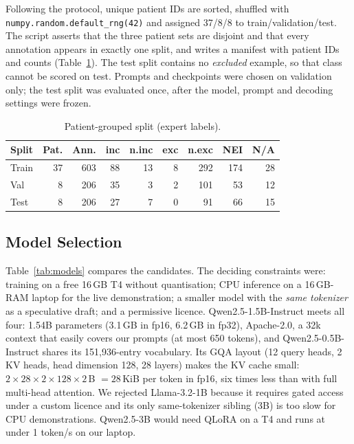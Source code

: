 \documentclass[conference]{IEEEtran}
\newcommand{\code}[1]{\texttt{\small #1}}
\begin{document}
Following the protocol, unique patient IDs are sorted, shuffled with \code{numpy.random.default\_rng(42)} and assigned 37/8/8 to train/validation/test. The script asserts that the three patient sets are disjoint and that every annotation appears in exactly one split, and writes a manifest with patient IDs and counts (Table~\ref{tab:split}). The test split contains no \emph{excluded} example, so that class cannot be scored on test. Prompts and checkpoints were chosen on validation only; the test split was evaluated once, after the model, prompt and decoding settings were frozen.

\begin{table}[t]
\caption{Patient-grouped split (expert labels).}
\label{tab:split}
\centering\footnotesize
\begin{tabular}{@{}lrrrrrrrr@{}}
\toprule
Split & Pat. & Ann. & inc & n.inc & exc & n.exc & NEI & N/A\\
\midrule
Train & 37 & 603 & 88 & 13 & 8 & 292 & 174 & 28\\
Val & 8 & 206 & 35 & 3 & 2 & 101 & 53 & 12\\
Test & 8 & 206 & 27 & 7 & 0 & 91 & 66 & 15\\
\bottomrule
\end{tabular}
\end{table}

\subsection{Model Selection}
Table~\ref{tab:models} compares the candidates. The deciding constraints were: training on a free 16\,GB T4 without quantisation; CPU inference on a 16\,GB-RAM laptop for the live demonstration; a smaller model with the \emph{same tokenizer} as a speculative draft; and a permissive licence. Qwen2.5-1.5B-Instruct meets all four: 1.54B parameters (3.1\,GB in fp16, 6.2\,GB in fp32), Apache-2.0, a 32k context that easily covers our prompts (at most 650 tokens), and Qwen2.5-0.5B-Instruct shares its 151,936-entry vocabulary. Its GQA layout (12 query heads, 2 KV heads, head dimension 128, 28 layers) makes the KV cache small: $2\times 28\times 2\times 128\times 2$\,B $=28$\,KiB per token in fp16, six times less than with full multi-head attention. We rejected Llama-3.2-1B because it requires gated access under a custom licence and its only same-tokenizer sibling (3B) is too slow for CPU demonstrations. Qwen2.5-3B would need QLoRA on a T4 and runs at under 1 token/s on our laptop.
\end{document}
